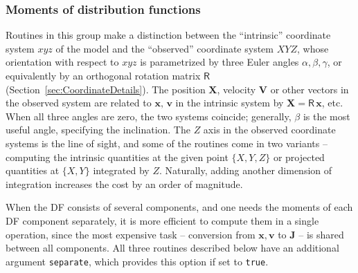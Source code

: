 \documentclass[12pt]{article}
\newcommand{\ppp}[1]{\textcolor{darkolive} {\texttt{#1}}}
\newcommand{\bv}{\boldsymbol{v}}
\newcommand{\bx}{\boldsymbol{x}}
\newcommand{\bX}{\boldsymbol{X}}
\newcommand{\bV}{\boldsymbol{V}}
\newcommand{\bJ}{\boldsymbol{J}}
\begin{document}
\subsubsection{Moments of distribution functions}  \label{sec:Moments}

Routines in this group make a distinction between the ``intrinsic'' coordinate system $xyz$ of the model and the ``observed'' coordinate system $XYZ$, whose orientation with respect to $xyz$ is parametrized by three Euler angles $\alpha,\beta,\gamma$, or equivalently by an orthogonal rotation matrix $\mathsf R$ (Section~\ref{sec:CoordinateDetails}). The position $\bX$, velocity $\bV$ or other vectors in the observed system are related to $\bx,\,\bv$ in the intrinsic system by $\bX = \mathsf R\,\bx$, etc. When all three angles are zero, the two systems coincide; generally, $\beta$ is the most useful angle, specifying the inclination. The $Z$ axis in the observed coordinate systems is the line of sight, and some of the routines come in two variants -- computing the intrinsic quantities at the given point $\{X,Y,Z\}$ or projected quantities at $\{X,Y\}$ integrated by $Z$. Naturally, adding another dimension of integration increases the cost by an order of magnitude.

When the DF consists of several components, and one needs the moments of each DF component separately, it is more efficient to compute them in a single operation, since the most expensive task -- conversion from $\bx,\bv$ to $\bJ$ -- is shared between all components. All three routines described below have an additional argument \ppp{separate}, which provides this option if set to \texttt{true}.
\end{document}
